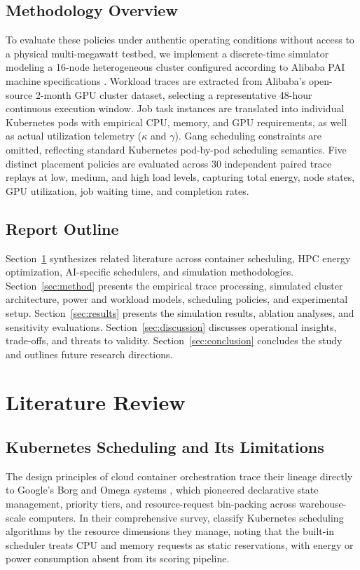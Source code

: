 \documentclass[a4paper,fleqn]{cas-dc}
\begin{document}
\subsection{Methodology Overview}
To evaluate these policies under authentic operating conditions without access to a physical multi-megawatt testbed, we implement a discrete-time simulator modeling a 16-node heterogeneous cluster configured according to Alibaba PAI machine specifications \citep{weng2022mlaas}. Workload traces are extracted from Alibaba's open-source 2-month GPU cluster dataset, selecting a representative 48-hour continuous execution window. Job task instances are translated into individual Kubernetes pods with empirical CPU, memory, and GPU requirements, as well as actual utilization telemetry ($\kappa$ and $\gamma$). Gang scheduling constraints are omitted, reflecting standard Kubernetes pod-by-pod scheduling semantics. Five distinct placement policies are evaluated across 30 independent paired trace replays at low, medium, and high load levels, capturing total energy, node states, GPU utilization, job waiting time, and completion rates.

\subsection{Report Outline}
Section~\ref{sec:litreview} synthesizes related literature across container scheduling, HPC energy optimization, AI-specific schedulers, and simulation methodologies. Section~\ref{sec:method} presents the empirical trace processing, simulated cluster architecture, power and workload models, scheduling policies, and experimental setup. Section~\ref{sec:results} presents the simulation results, ablation analyses, and sensitivity evaluations. Section~\ref{sec:discussion} discusses operational insights, trade-offs, and threats to validity. Section~\ref{sec:conclusion} concludes the study and outlines future research directions.

\section{Literature Review}\label{sec:litreview}

\subsection{Kubernetes Scheduling and Its Limitations}
The design principles of cloud container orchestration trace their lineage directly to Google's Borg and Omega systems \citep{burns2016borg}, which pioneered declarative state management, priority tiers, and resource-request bin-packing across warehouse-scale computers. In their comprehensive survey, \citet{senjab2023survey} classify Kubernetes scheduling algorithms by the resource dimensions they manage, noting that the built-in scheduler treats CPU and memory requests as static reservations, with energy or power consumption absent from its scoring pipeline. 
\end{document}
